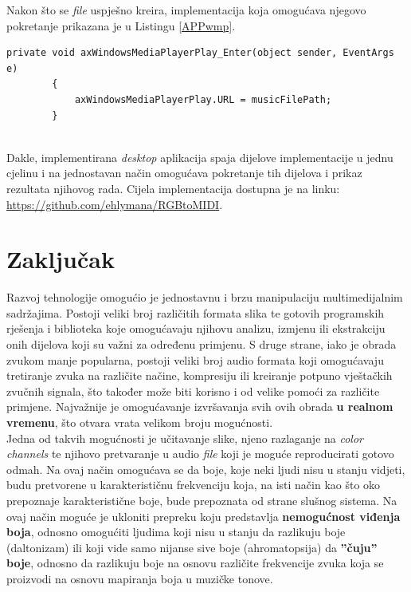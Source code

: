 \documentclass[12pt,a4paper]{article}
\begin{document}
Nakon što se \textit{file} uspješno kreira, implementacija koja omogućava njegovo pokretanje prikazana je u Listingu \ref{APPwmp}.

\begin{lstlisting}[language={[Sharp]C}, caption={Pokretanje reprodukcije MIDI \textit{file}-a}, label={APPwmp}]
private void axWindowsMediaPlayerPlay_Enter(object sender, EventArgs e)
        {
            axWindowsMediaPlayerPlay.URL = musicFilePath;
        }
\end{lstlisting}
~\\

Dakle, implementirana \textit{desktop} aplikacija spaja dijelove implementacije u jednu cjelinu i na jednostavan način omogućava pokretanje tih dijelova i prikaz rezultata njihovog rada. Cijela implementacija dostupna je na linku: \href{https://github.com/ehlymana/RGBtoMIDI}{https://github.com/ehlymana/RGBtoMIDI}.

\newpage

\section{Zaključak}

Razvoj tehnologije omogućio je jednostavnu i brzu manipulaciju multimedijalnim sadržajima. Postoji veliki broj različitih formata slika te gotovih programskih rješenja i biblioteka koje omogućavaju njihovu analizu, izmjenu ili ekstrakciju onih dijelova koji su važni za određenu primjenu. S druge strane, iako je obrada zvukom manje popularna, postoji veliki broj audio formata koji omogućavaju tretiranje zvuka na različite načine, kompresiju ili kreiranje potpuno vještačkih zvučnih signala, što također može biti korisno i od velike pomoći za različite primjene. Najvažnije je omogućavanje izvršavanja svih ovih obrada \textbf{u realnom vremenu}, što otvara vrata velikom broju mogućnosti. \\

Jedna od takvih mogućnosti je učitavanje slike, njeno razlaganje na \textit{color channels} te njihovo pretvaranje u audio \textit{file} koji je moguće reproducirati gotovo odmah. Na ovaj način omogućava se da boje, koje neki ljudi nisu u stanju vidjeti, budu pretvorene u karakterističnu frekvenciju koja, na isti način kao što oko prepoznaje karakteristične boje, bude prepoznata od strane slušnog sistema. Na ovaj način moguće je ukloniti prepreku koju predstavlja \textbf{nemogućnost viđenja boja}, odnosno omogućiti ljudima koji nisu u stanju da razlikuju boje (daltonizam) ili koji vide samo nijanse sive boje (ahromatopsija) da \textbf{''čuju'' boje}, odnosno da razlikuju boje na osnovu različite frekvencije zvuka koja se proizvodi na osnovu mapiranja boja u muzičke tonove. \\
\end{document}
